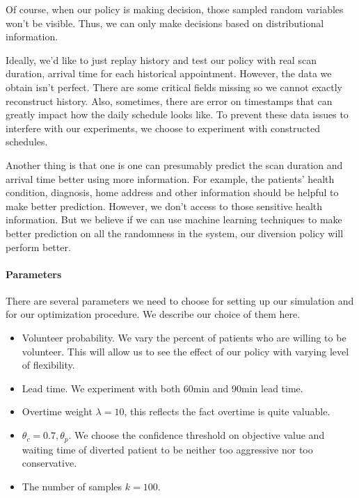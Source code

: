 Of course, when our policy is making decision, those sampled random variables
won't be visible. Thus, we can only make decisions based on distributional
information.

Ideally, we'd like to just replay history and test our policy with real
scan duration, arrival time for each historical appointment. However,
the data we obtain isn't perfect. There are some critical fields missing
so we cannot exactly reconstruct history. Also, sometimes, there are
error on timestamps that can greatly impact how the daily schedule looks like.
To prevent these data issues to interfere with our experiments, we choose
to experiment with constructed schedules.

Another thing is that one is one can presumably predict the scan duration and
arrival time better using more information. For example, the patients'
health condition, diagnosis, home address and other information should be
helpful to make better prediction. However, we don't access to those
sensitive health information. But we believe if we can use machine learning
techniques to make better prediction on all the randomness in the system,
our diversion policy will perform better.

\paragraph{Parameters}

There are several parameters we need to choose for setting up our simulation
and for our optimization procedure. We describe our choice of them here.

\begin{itemize}
  \item Volunteer probability. We vary the percent of patients who are willing
    to be volunteer. This will allow us to see the effect of our policy
    with varying level of flexibility.
  \item Lead time. We experiment with both 60min and 90min lead time.
  \item Overtime weight $\lambda = 10$, this reflects the fact overtime is quite valuable.
  \item $\theta_c = 0.7, \theta_p$. We choose the confidence threshold on objective value
    and waiting time of diverted patient to be neither too aggressive nor too conservative.
  \item The number of samples $k=100$.
\end{itemize}
